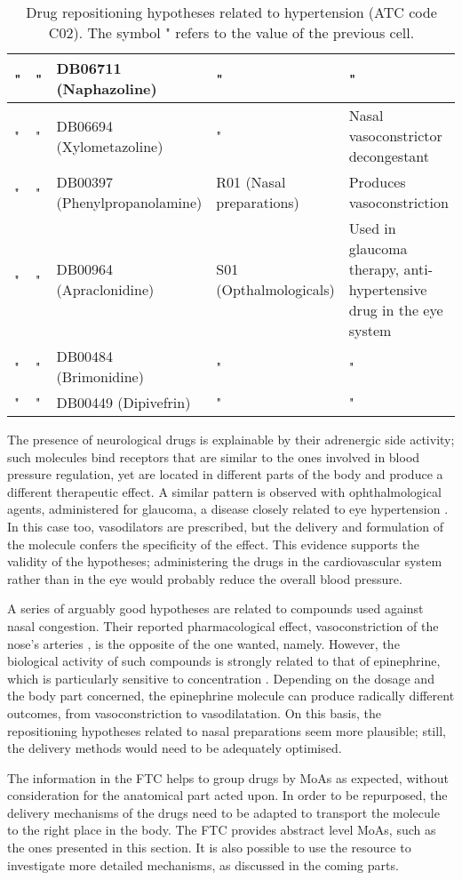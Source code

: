 \begin{table}[htbp]
\begin{tabular}{|p{2cm}|p{2cm}|p{2cm}|p{3cm}|p{4cm}|}
" & " & DB06711 (Naphazoline) & " & " \\ \hline
" & " & DB06694 (Xylometazoline) & " & Nasal vasoconstrictor decongestant \\ \hline
" & " & DB00397 (Phenylpropanolamine) & R01 (Nasal preparations) & Produces vasoconstriction \\ \hline
" & " & DB00964 (Apraclonidine) & S01 (Opthalmologicals) & Used in glaucoma therapy, anti-hypertensive drug in the eye system\\ \hline
" & " & DB00484 (Brimonidine) & " & " \\ \hline
" & " & DB00449 (Dipivefrin) & " & " \\ \hline
\end{tabular}
\caption{Drug repositioning hypotheses related to hypertension (ATC code C02). The symbol " refers to the value of the previous cell.}
\label{tab:tablel02}
\end{table}

The presence of neurological drugs is explainable by their adrenergic side activity; such molecules bind receptors that are similar to the ones involved in blood pressure regulation, yet are located in different parts of the body and produce a different therapeutic effect. A similar pattern is observed with ophthalmological agents, administered for glaucoma, a disease closely related to eye hypertension \citep{quigley1996number}. In this case too, vasodilators are prescribed, but the delivery and formulation of the molecule confers the specificity of the effect. This evidence supports the validity of the hypotheses; administering the drugs in the cardiovascular system rather than in the eye would probably reduce the overall blood pressure.

A series of arguably good hypotheses are related to compounds used against nasal congestion. Their reported pharmacological effect, vasoconstriction of the nose’s arteries \citep{bende1996effect}, is the opposite of the one wanted, namely. However, the biological activity of such compounds is strongly related to that of epinephrine, which is particularly sensitive to concentration \citep{evans2001epinephrine}. Depending on the dosage and the body part concerned, the epinephrine molecule can produce radically different outcomes, from vasoconstriction to vasodilatation. On this basis, the repositioning hypotheses related to nasal preparations seem more plausible; still, the delivery methods would need to be adequately optimised.

The information in the FTC helps to group drugs by MoAs as expected, without consideration for the anatomical part acted upon. In order to be repurposed, the delivery mechanisms of the drugs need to be adapted to transport the molecule to the right place in the body. The FTC provides abstract level MoAs, such as the ones presented in this section. It is also possible to use the resource to investigate more detailed mechanisms, as discussed in the coming parts.

